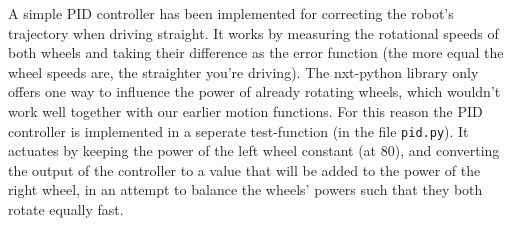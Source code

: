 \documentclass[a4paper, 20pt]{report}
\begin{document}
\begin{enumerate}
            A simple PID controller has been implemented for correcting the
            robot's trajectory when driving straight. It works by measuring the
            rotational speeds of both wheels and taking their difference as the
            error function (the more equal the wheel speeds are, the straighter
            you're driving). The nxt-python library only offers one way to
            influence the power of already rotating wheels, which wouldn't work
            well together with our earlier motion functions. For this reason the
            PID controller is implemented in a seperate test-function (in the file
            \texttt{pid.py}). It actuates by keeping the power of
            the left wheel constant (at 80), and converting the output of the
            controller to a value that will be added to the power of the right
            wheel, in an attempt to balance the wheels' powers such that they
            both rotate equally fast.
\end{enumerate}
\end{document}
